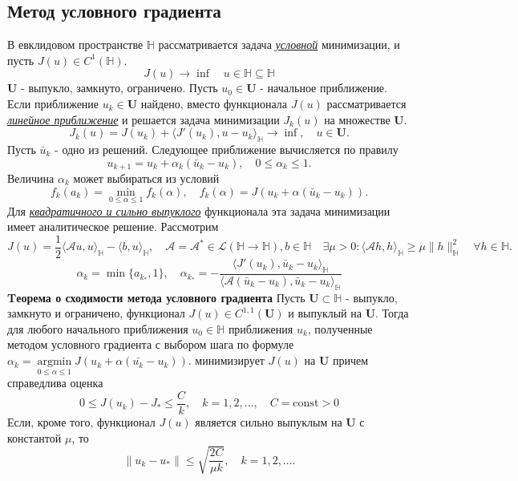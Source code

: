 \documentclass[A4]{article}
\begin{document}
\subsection{Метод условного градиента}
В евклидовом пространстве $\mathbb{H}$ рассматривается задача \underline{\emph{условной}} минимизации, и пусть $J(u)\in C^1(\mathbb{H}).$
\begin{equation*}
J(u)\rightarrow \inf\quad u\in\mathbb{H}\subseteq\mathbb{H}
\end{equation*}
$\mathbf{U}$ - выпукло, замкнуто, ограничено. Пусть $u_0\in\mathbf{U}$ - начальное приближение. Если приближение $u_k\in\mathbf{U}$ найдено, вместо функционала $J(u)$ рассматривается \underline{\emph{линейное приближение}} и решается задача минимизации $J_k(u)$ на множестве $\mathbf{U}$.
\begin{equation*}
J_k(u)=J(u_k)+\langle J'(u_k),u-u_k\rangle_{\mathbb{H}}\rightarrow\inf,\quad u\in\mathbf{U}.
\end{equation*}
Пусть $\bar{u}_k$ - одно из решений. Следующее приближение вычисляется по правилу
\begin{equation*}
u_{k+1}=u_k+\alpha_{k}(\bar{u}_k-u_k),\quad 0\leqslant\alpha_{k}\leqslant 1.
\end{equation*}
Величина $\alpha_k$ может выбираться из условий
\begin{equation*}
f_k(a_k)=\min_{0\leqslant\alpha\leqslant 1}f_k(\alpha),\quad f_k(\alpha)=J(u_k+\alpha(\bar{u}_k-u_k)).
\end{equation*}
Для \underline{\emph{квадратичного и сильно выпуклого}} функционала эта задача минимизации имеет аналитическое решение. Рассмотрим 
\begin{equation*}
J(u)=\frac{1}{2}\langle\mathcal{A}u,u\rangle_{\mathbb{H}}-\langle b,u\rangle_{\mathbb{H}},\quad \mathcal{A}=\mathcal{A}^*\in\mathcal{L}(\mathbb{H}\rightarrow\mathbb{H}),b\in\mathbb{H}\quad\exists\mu>0: \langle\mathcal{A}h,h\rangle_{\mathbb{H}}\geqslant\mu\|h\|^2_{\mathbb{H}}\quad\forall h\in\mathbb{H}.
\end{equation*}
\begin{equation*}
\alpha_k=\min\{a_{k_*},1 \},\quad\alpha_{k_*}=-\frac{\langle J'(u_k),\bar{u}_k-u_k\rangle_{\mathbb{H}}}{\langle \mathcal{A}(\bar{u}_k-u_k),\bar{u}_k-u_k\rangle_{\mathbb{H}}}
\end{equation*}
\textbf{Tеорема о сходимости метода условного градиента} Пусть $\mathbf{U}\subset\mathbb{H}$ - выпукло, замкнуто и ограничено, функционал $J(u)\in C^{1,1}(\mathbf{U})$ и выпуклый на $\mathbf{U}$. Тогда для любого начального приближения $ u_{0} \in \mathbb{H} $ приближения $ u_{k}$, полученные методом условного градиента с выбором шага по формуле $ \alpha_{k}=\underset{0\leqslant\alpha\leqslant 1}{\operatorname{argmin}}J(u_k+\alpha(\bar{u_k}-u_k)).$ минимизирует $J(u)$ на $\mathbf{U}$ причем справедлива оценка
\begin{equation*}
0\leqslant J(u_k)-J_*\leqslant\frac{C}{k}, \quad k=1,2, \ldots,\quad C=\text{const}>0
\end{equation*}
Если, кроме того, функционал $J(u)$ является сильно выпуклым на $\mathbf{U}$ с константой $\mu$, то
\begin{equation*}
\|u_k-u_*\|\leqslant\sqrt{\frac{2C}{\mu k}},\quad k=1,2,\ldots.
\end{equation*}
\end{document}

